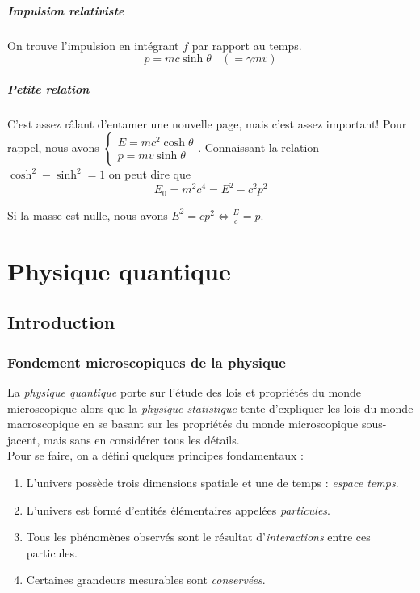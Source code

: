 \documentclass[british,french,11pt, a4paper, openany]{book}
\begin{document}
	\subsubsection*{Impulsion relativiste}
	On trouve l'impulsion en intégrant $f$ par rapport au temps.
	$$p = mc\sinh\theta\ \ \ \ (= \gamma mv)$$
	
	\subsubsection*{Petite relation}
	C'est assez râlant d'entamer une nouvelle page, mais c'est assez important! Pour rappel, nous avons $\left\{\begin{array}{l}
	E = mc^2\cosh\theta\\
	p = mv\sinh\theta
	\end{array}\right.$. Connaissant la relation $\cosh^2 - \sinh^2 = 1$ on peut dire que 
	$$E_0 = m^2c^4 = E^2 - c^2p^2$$
	
	Si la masse est nulle, nous avons $E^2 = cp^2 \Leftrightarrow \frac{E}{c} = p$.
	
	\part{Physique quantique}
	\chapter{Introduction}
	\section{Fondement microscopiques de la physique}
	La \textit{physique quantique} porte sur l'étude des lois et propriétés du monde microscopique alors que la \textit{physique statistique} tente d'expliquer les lois du monde macroscopique en se basant sur les propriétés du monde microscopique sous-jacent, mais sans en considérer tous les détails.\\
	Pour se faire, on a défini quelques principes fondamentaux :
	\begin{enumerate}
		\item L'univers possède trois dimensions spatiale et une de temps : \textit{espace temps}.
		\item L'univers est formé d'entités élémentaires appelées \textit{particules}.
		\item Tous les phénomènes observés sont le résultat d'\textit{interactions} entre ces particules.
		\item Certaines grandeurs mesurables sont \textit{conservées}.
	\end{enumerate}
	
\end{document}
